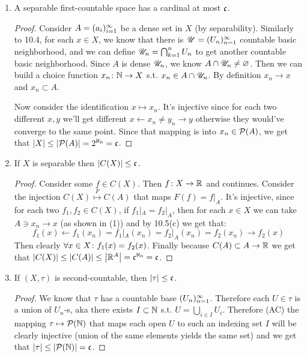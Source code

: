 \documentclass[a4paper]{article}
\begin{document}
	\begin{enumerate}
		\item A separable first-countable space has a cardinal at most $\mathfrak{c}$. \begin{proof}
			Consider $A = (a_i)_{i = 1}^{\infty}$ be a dense set in $X$ (by separability). 
			Similarly to 10.4, for each $x \in X$, we know that there is $\mathscr{U} = (U_n)_{n = 1}^{\infty}$ countable basic neighborhood, and we can define $\mathscr{U}_n = \bigcap_{k = 1}^{n}U_n$ to get another countable basic neighborhood. Since $A$ is dense $\mathscr{U}_n$, we know $A \cap \mathscr{U}_n \neq \varnothing$. Then we can build a choice function $x_n \colon \mathbb{N} \to X$ s.t. $x_n \in A \cap \mathscr{U}_n$. By definition $x_n \to x$ and $x_n \subset A$. 
			
			Now consider the identification $x \mapsto x_n$. It's injective since for each two different $x, y$ we'll get different $x \leftarrow x_n \neq y_n \to y$ otherwise they would've converge to the same point. Since that mapping is into $x_n \in \mathcal{P}(A)$, we get that $\left \lvert X \right \rvert \le \left \lvert \mathcal{P}(A) \right \rvert = 2^{\aleph_0} = \mathfrak{c}$. 
		\end{proof}
		\item If $X$ is separable then $\left \lvert C(X) \right \rvert \le \mathfrak{c}$. \begin{proof}
			Consider some $f \in C(X)$. Then $f \colon X \to \mathbb{R}$ and continues. Consider the injection $C(X) \overset{F}{\mapsto} C(A)$ that maps $F(f) = f|_A$. It's injective, since for each two $f_1, f_2 \in C(X)$, if $f_1|_A = f_2|_A$, then for each $x \in X$ we can take $A \ni x_n \to x$ (as shown in (1)) and by 10.5(c) we get that: 
			\[ f_1(x) \leftarrow f_1(x_n) = f_1|_A(x_n) = f_2|_A(x_n) = f_2(x_n) \to f_2(x) \]
			Then clearly $\forall x \in X \colon f_1(x) = f_2(x)$. Finally because $C(A) \subset A \to \mathbb{R}$ we get that $\left \lvert C(X) \right \rvert \le \left \lvert C(A) \right \rvert \le \left \lvert \mathbb{R}^A \right \rvert = \mathfrak{c}^{\aleph_0} = \mathfrak{c}$. 
		\end{proof}
		\item If $(X, \tau)$ is second-countable, then $\left \lvert \tau \right \rvert \le \mathfrak{c}$. \begin{proof}
			We know that $\tau$ has a countable base $(U_n)_{n = 1}^{\infty}$. Therefore each $U \in \tau$ is a union of $U_n$-s, aka there exists $I \subset \mathbb{N}$ s.t. $U = \bigcup_{i \in I}U_i$. Therefore (AC) the mapping $\tau \mapsto \mathcal{P}(\mathbb{N})$ that maps each open $U$ to such an indexing set $I$ will be clearly injective (union of the same elements yields the same set) and we get that $\left \lvert \tau \right \rvert \le \left \lvert \mathcal{P}(\mathbb{N}) \right \rvert = \mathfrak{c}$. 
		\end{proof}
	\end{enumerate}
	
\end{document}
